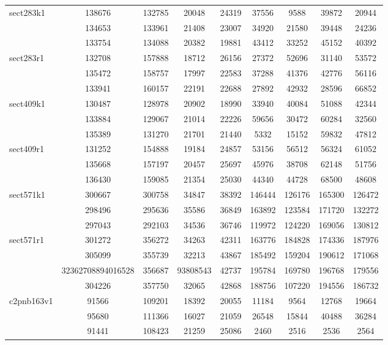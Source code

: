 \documentclass[a4paper]{article}
\begin{document}
\begin{center}
\begin{longtable}{ |l|c|c|c|c|c|c|c|c| }
sect283k1 & 138676 & 132785 & 20048 & 24319 & 37556 & 9588 & 39872 & 20944 \\ 
& 134653 & 133961 & 21408 & 23007 & 34920 & 21580 & 39448 & 24236 \\
& 133754 & 134088 & 20382 & 19881 & 43412 & 33252 & 45152 & 40392 \\ \hline

sect283r1 & 132708 & 157888 & 18712 & 26156 & 27372 & 52696 & 31140 & 53572 \\
& 135472 & 158757 & 17997 & 22583 & 37288 & 41376 & 42776 & 56116 \\ 
& 133941 & 160157 & 22191 & 22688 & 27892 & 42932 & 28596 & 66852 \\ \hline

sect409k1 & 130487 & 128978 & 20902 & 18990 & 33940 & 40084 & 51088 & 42344 \\
& 133884 & 129067 & 21014 & 22226 & 59656 & 30472 & 60284 & 32560 \\
& 135389 & 131270 & 21701 & 21440 & 5332 & 15152 & 59832 & 47812 \\ \hline

sect409r1 & 131252 & 154888 & 19184 & 24857 & 53156 & 56512 & 56324 & 61052 \\ 
& 135668 & 157197 & 20457 & 25697 & 45976 & 38708 & 62148 & 51756 \\
& 136430 & 159085 & 21354 & 25030 & 44340 & 44728 & 68500 & 48608 \\ \hline

sect571k1 & 300667 & 300758 & 34847 & 38392 & 146444 & 126176 & 165300 & 126472 \\ 
& 298496 & 295636 & 35586 & 36849 & 163892 & 123584 & 171720 & 132272 \\ 
& 297043 & 292103 & 34536 & 36746 & 119972 & 124220 & 169056 & 130812 \\ \hline

sect571r1 & 301272 & 356272 & 34263 & 42311 & 163776 & 184828 & 174336 & 187976 \\
& 305099 & 355739 & 32213 & 43867 & 185492 & 159204 & 190612 & 171068 \\ 
& 32362708894016528 & 356687 & 93808543 & 42737 & 195784 & 169780 & 196768 & 179556 \\ 
& 304226 & 357750 & 32065 & 42868 & 188756 & 107220 & 194556 & 186732 \\ \hline

c2pnb163v1 & 91566 & 109201 & 18392 & 20055 & 11184 & 9564 & 12768 & 19664 \\
& 95680 & 111366 & 16027 & 21059 & 26548 & 15844 & 40488 & 36284 \\ 
& 91441 & 108423 & 21259 & 25086 & 2460 & 2516 & 2536 & 2564 \\ \hline


\end{longtable}
\end{center}
\end{document}
